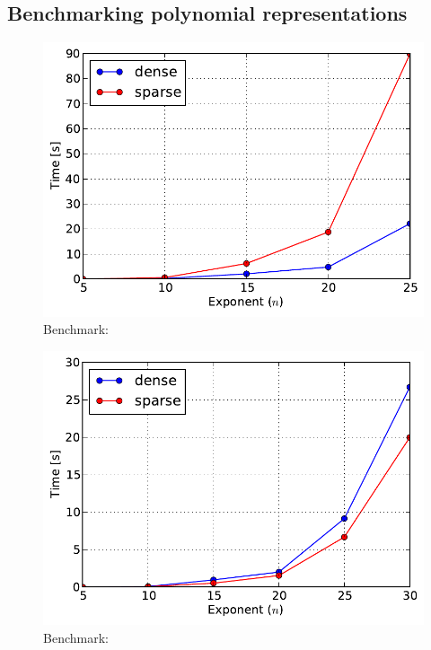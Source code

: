 \subsection{Benchmarking polynomial representations}
\begin{figure}[htbp]
\centering

\includegraphics{100-dense-power.pdf}
\caption{Benchmark:\label{fig-100-dense-power}}\end{figure}
\begin{figure}[htbp]
\centering

\includegraphics{50-dense-power.pdf}
\caption{Benchmark:\label{fig-50-dense-power}}\end{figure}
